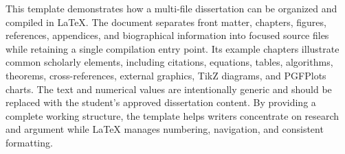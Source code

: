 This template demonstrates how a multi-file dissertation can be organized and compiled in LaTeX. The document separates front matter, chapters, figures, references, appendices, and biographical information into focused source files while retaining a single compilation entry point. Its example chapters illustrate common scholarly elements, including citations, equations, tables, algorithms, theorems, cross-references, external graphics, TikZ diagrams, and PGFPlots charts. The text and numerical values are intentionally generic and should be replaced with the student's approved dissertation content. By providing a complete working structure, the template helps writers concentrate on research and argument while LaTeX manages numbering, navigation, and consistent formatting.

